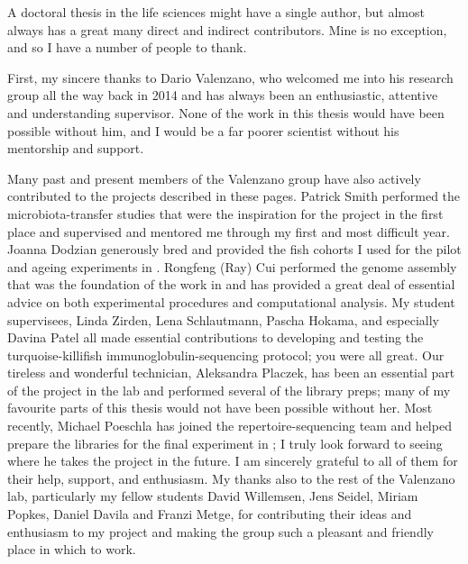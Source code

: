 
\begin{acknowledgements}      
A doctoral thesis in the life sciences might have a single author, but almost always has a great many direct and indirect contributors. Mine is no exception, and so I have a number of people to thank.

First, my sincere thanks to Dario Valenzano, who welcomed me into his research group all the way back in 2014 and has always been an enthusiastic, attentive and understanding supervisor. None of the work in this thesis would have been possible without him, and I would be a far poorer scientist without his mentorship and support.

Many past and present members of the Valenzano group have also actively contributed to the projects described in these pages. Patrick Smith performed the microbiota-transfer studies that were the inspiration for the project in the first place and supervised and mentored me through my first and most difficult year. Joanna Dodzian generously bred and provided the fish cohorts I used for the pilot and ageing experiments in . Rongfeng (Ray) Cui performed the genome assembly that was the foundation of the work in  and has provided a great deal of essential advice on both experimental procedures and computational analysis. My student supervisees, Linda Zirden, Lena Schlautmann, Pascha Hokama, and especially Davina Patel all made essential contributions to developing and testing the turquoise-killifish immunoglobulin-sequencing protocol; you were all great. Our tireless and wonderful technician, Aleksandra Placzek, has been an essential part of the \igseq project in the lab and performed several of the library preps; many of my favourite parts of this thesis would not have been possible without her. Most recently, Michael Poeschla has joined the repertoire-sequencing team and helped prepare the libraries for the final \igseq experiment in ; I truly look forward to seeing where he takes the project in the future. I am sincerely grateful to all of them for their help, support, and enthusiasm. My thanks also to the rest of the Valenzano lab, particularly my fellow students David Willemsen, Jens Seidel, Miriam Popkes, Daniel Davila and Franzi Metge, for contributing their ideas and enthusiasm to my project and making the group such a pleasant and friendly place in which to work. %


\end{acknowledgements}
